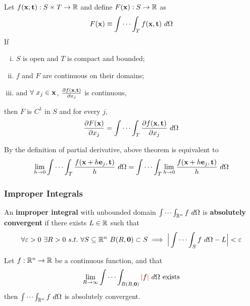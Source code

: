 \documentclass[11pt]{article}
\begin{document}
			\begin{theorem}
				Let $f(\textbf{x}, \textbf{t}): S \times T \to \mathbb{R}$ and define $F(\textbf{x}): S \to \mathbb{R}$ as 
				\begin{equation}
					F(\textbf{x}) \equiv \int \cdots \int_T f(\textbf{x}, \textbf{t})\ d\Omega
				\end{equation}
				If
				\begin{enumerate}[(i)]
					\item $S$ is open and $T$ is compact and bounded;
					\item $f$ and $F$ are continuous on their domains;
					\item and $\forall\ x_j \in \textbf{x}$, $\frac{\partial{f(\textbf{x}, \textbf{t})}}{\partial{x_j}}$ is continuous,
				\end{enumerate}
				then $F$ is $C^1$ in $S$ and for every $j$,
				\begin{equation}
					\frac{\partial{F(\textbf{x})}}{\partial{x_j}} = \idotsint_T \frac{\partial{f(\textbf{x}, \textbf{t})}}{\partial{x_j}}\ d\Omega
				\end{equation}
			\end{theorem}
	
			\begin{corollary}
				By the definition of partial derivative, above theorem is equivalent to 
				\begin{equation}
					\lim_{h \to 0} \idotsint_T \frac{f(\textbf{x} + h \textbf{e}_j, \textbf{t})}{h}\ d\Omega = \idotsint_T \lim_{h \to 0} \frac{f(\textbf{x} + h \textbf{e}_j, \textbf{t})}{h}\ d\Omega
				\end{equation}
			\end{corollary}
			
			\subsubsection{Improper Integrals}
				\begin{definition}
					An \textbf{improper integral} with unbounded domain $\idotsint_{\mathbb{R}^n} f\ d\Omega$ is \textbf{absolutely convergent} if there exists $L \in \mathbb{R}$ such that
					\begin{equation}
						\forall \varepsilon > 0\ \exists R > 0\ s.t.\ \forall S \subseteq \R^n\ B(R, \ve{0}) \subset S \implies \Big|\idotsint_S f\ d\Omega - L \Big| < \varepsilon
					\end{equation}
				\end{definition}
				
				\begin{theorem}
					Let $f: \mathbb{R}^n \to \mathbb{R}$ be a continuous function, and that 
					\begin{equation}
						\lim_{R \to \infty} \idotsint_{B(R, \textbf{0})}\textcolor{red}{|}f\textcolor{red}{|}\ d\Omega \text{{ exists}}
					\end{equation}
					then $\idotsint_{\mathbb{R}^n}f\ d\Omega$ is absolutely convergent.
				\end{theorem}
				
\end{document}
